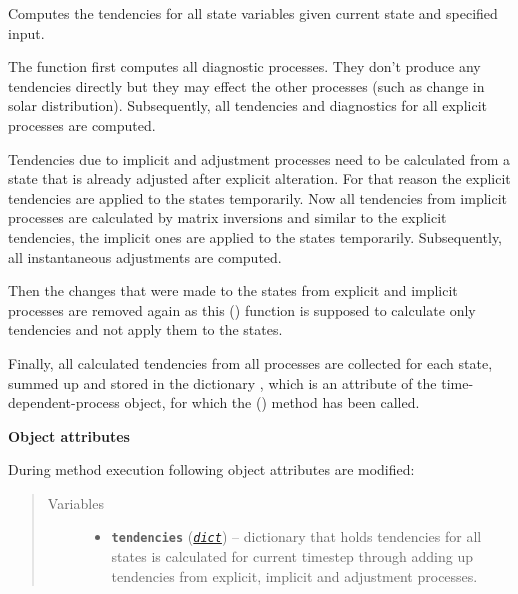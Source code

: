\documentclass[a4paper,10pt,english]{sphinxmanual}
\begin{document}
\begin{fulllineitems}
\begin{quote}
\begin{description}
\begin{itemize}
\end{itemize}

\end{description}\end{quote}

\begin{fulllineitems}
\label{api/climlab.process:climlab.process.time_dependent_process.TimeDependentProcess.compute}
Computes the tendencies for all state variables given current state 
and specified input.

The function first computes all diagnostic processes. They don't produce 
any tendencies directly but they may effect the other processes (such as
change in solar distribution). Subsequently, all tendencies and 
diagnostics for all explicit processes are computed.

Tendencies due to implicit and adjustment processes need to be
calculated from a state that is already adjusted after explicit 
alteration. For that reason the explicit tendencies are applied to the 
states temporarily. Now all tendencies from implicit processes are 
calculated by matrix inversions and similar to the explicit tendencies,
the implicit ones are applied to the states temporarily. Subsequently,
all instantaneous adjustments are computed.

Then the changes that were made to the states from explicit and implicit 
processes are removed again as this 
{\hyperref[api/climlab.process:climlab.process.time_dependent_process.TimeDependentProcess.compute]{\emph{}}} ()
function is supposed to calculate only tendencies and not apply them 
to the states.

Finally, all calculated tendencies from all processes are collected 
for each state, summed up and stored in the dictionary 
, which is an attribute of the time-dependent-process 
object, for which the 
{\hyperref[api/climlab.process:climlab.process.time_dependent_process.TimeDependentProcess.compute]{\emph{}}} ()
method has been called.

\textbf{Object attributes}

During method execution following object attributes are modified:
\begin{quote}\begin{description}
\item[{Variables}] \leavevmode\begin{itemize}
\item {} 
\textbf{\texttt{tendencies}} (\href{http://docs.python.org/2.7/library/stdtypes.html\#dict}{\emph{\texttt{dict}}}) -- dictionary that holds tendencies for all states
is calculated for current timestep through 
adding up tendencies from explicit, implicit and
adjustment processes.


\end{itemize}
\end{description}
\end{quote}
\end{fulllineitems}
\end{fulllineitems}
\end{document}
